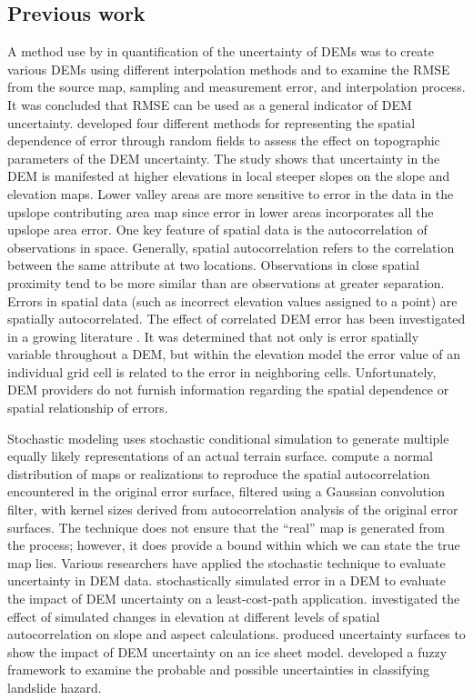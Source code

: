 \documentclass[a4paper,fleqn]{article}
\begin{document}
\subsection{Previous work}

A method use by \citep{Qihao_Weng} in quantification of the
uncertainty of DEMs was to create various DEMs using different
interpolation methods and to examine the RMSE from the source map,
sampling and measurement error, and interpolation process. It was
concluded that RMSE can be used as a general indicator of DEM
uncertainty.  \citep{Suzanne_Wechsler} developed four different
methods for representing the spatial dependence of error through
random fields to assess the effect on topographic parameters of the
DEM uncertainty. The study shows that uncertainty in the DEM is
manifested at higher elevations in local steeper slopes on the slope
and elevation maps.  Lower valley areas are more sensitive to error in
the data in the upslope contributing area map since error in lower
areas incorporates all the upslope area error.
One key feature of spatial data is the autocorrelation of observations
in space.  Generally, spatial autocorrelation refers to the
correlation between the same attribute at two locations. Observations
in close spatial proximity tend to be more similar than are
observations at greater separation. Errors in spatial data (such as
incorrect elevation values assigned to a point) are spatially
autocorrelated. The effect of correlated DEM error has been
investigated in a growing literature \citep{Fisher_1991,
Goodchild_1992}. It was determined that not only is error spatially
variable throughout a DEM, but within the elevation model the error
value of an individual grid cell is related to the error in
neighboring cells. Unfortunately, DEM providers do not furnish
information regarding the spatial dependence or spatial relationship
of errors.

Stochastic modeling uses stochastic conditional simulation to generate
multiple equally likely representations of an actual terrain
surface. \citep{Hunter_Goodchild_1997, Ehlschlaeger_1996} compute a
normal distribution of maps or realizations to reproduce the spatial
autocorrelation encountered in the original error surface, filtered
using a Gaussian convolution filter, with kernel sizes derived from
autocorrelation analysis of the original error surfaces. The technique
does not ensure that the ``real'' map is generated from the process;
however, it does provide a bound within which we can state the true
map lies.
Various researchers have applied the stochastic technique to evaluate
uncertainty in DEM data. \citep{Ehlschlaeger_1996} stochastically
simulated error in a DEM to evaluate the impact of DEM uncertainty on
a least-cost-path application. \citep{Hunter_Goodchild_1997}
investigated the effect of simulated changes in elevation at different
levels of spatial autocorrelation on slope and aspect
calculations. \citep{Felix_Hebeler} produced uncertainty surfaces to
show the impact of DEM uncertainty on an ice sheet
model. \citep{Amii_Darnell} developed a fuzzy framework to examine the
probable and possible uncertainties in classifying landslide hazard.
\end{document}
